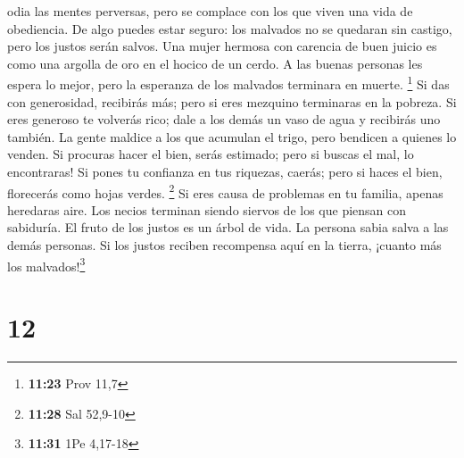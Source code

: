 odia las mentes perversas, pero se complace con los que viven una vida
de obediencia.  De algo puedes estar seguro: los malvados
no se quedaran sin castigo, pero los justos serán salvos.
 Una mujer hermosa con carencia de buen juicio es como
una argolla de oro en el hocico de un cerdo.  A las
buenas personas les espera lo mejor, pero la esperanza de los malvados
terminara en muerte. \footnote{\textbf{11:23} Prov 11,7} 
Si das con generosidad, recibirás más; pero si eres mezquino terminaras
en la pobreza.  Si eres generoso te volverás rico; dale a
los demás un vaso de agua y recibirás uno también.  La
gente maldice a los que acumulan el trigo, pero bendicen a quienes lo
venden.  Si procuras hacer el bien, serás estimado; pero
si buscas el mal, lo encontraras!  Si pones tu confianza
en tus riquezas, caerás; pero si haces el bien, florecerás como hojas
verdes. \footnote{\textbf{11:28} Sal 52,9-10}  Si eres
causa de problemas en tu familia, apenas heredaras aire. Los necios
terminan siendo siervos de los que piensan con sabiduría.
 El fruto de los justos es un árbol de vida. La persona
sabia salva a las demás personas.  Si los justos reciben
recompensa aquí en la tierra, ¡cuanto más los malvados!\footnote{\textbf{11:31}
  1Pe 4,17-18}

\hypertarget{section-11}{%
\section{12}\label{section-11}}

